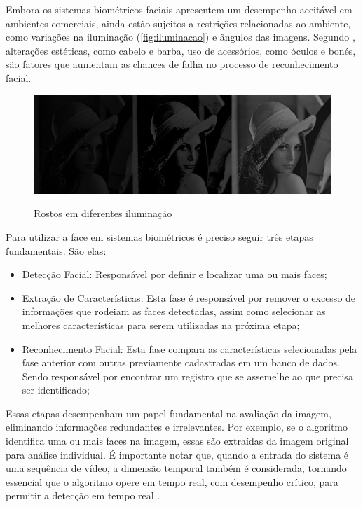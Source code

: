 Embora os sistemas biométricos faciais apresentem um desempenho aceitável em 
ambientes comerciais, ainda estão sujeitos a restrições relacionadas ao ambiente, 
como variações na iluminação (\autoref{fig:iluminacao}) e ângulos das imagens.
Segundo , alterações estéticas, como cabelo e barba, uso de
acessórios, como óculos e bonés, são fatores que aumentam as chances de falha no processo
de reconhecimento facial.

\begin{figure}[h!]
    \centering
    \caption{Rostos em diferentes iluminação}
    \includegraphics[scale=0.25]{figuras/iluminacao.png}
    \label{fig:iluminacao}
    \centering
\end{figure}

Para utilizar a face em sistemas biométricos é preciso seguir três
etapas fundamentais. São elas:

\begin{itemize}
    \item Detecção Facial: Responsável por definir e localizar uma ou mais
    faces;

    \item Extração de Características: Esta fase é responsável por remover o excesso de
    informações que rodeiam as faces detectadas, assim como selecionar as melhores
    características para serem utilizadas na próxima etapa;

    \item Reconhecimento Facial: Esta fase compara as características selecionadas pela fase
    anterior com outras previamente cadastradas em um banco de dados. Sendo
    responsável por encontrar um registro que se assemelhe ao que precisa ser
    identificado;

\end{itemize}

Essas etapas desempenham um papel fundamental na avaliação da imagem, eliminando informações 
redundantes e irrelevantes. Por exemplo, se o algoritmo identifica uma ou mais faces na 
imagem, essas são extraídas da imagem original para análise individual. É importante 
notar que, quando a entrada do sistema é uma sequência de vídeo, a dimensão temporal 
também é considerada, tornando essencial que o algoritmo opere em tempo real, com 
desempenho crítico, para permitir a detecção em tempo real \cite{boechat2008}. 

